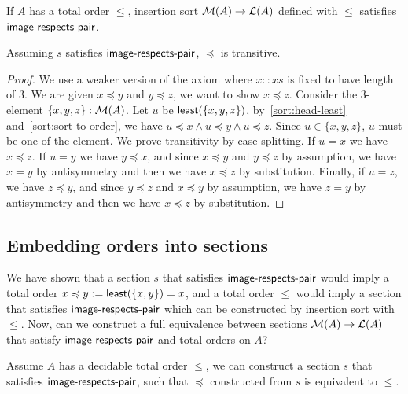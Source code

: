 \begin{proposition}
    If $A$ has a total order $\leq$, insertion sort $\mathcal{M}(A) \to \mathcal{L}(A)$ defined with $\leq$
    satisfies $\operatorname{\mathsf{image-respects-pair}}$.
\end{proposition}

\begin{proposition}
    Assuming $s$ satisfies $\operatorname{\mathsf{image-respects-pair}}$, $\preccurlyeq$ is transitive.
\end{proposition}
\begin{proof}
    We use a weaker version of the axiom where $x :: xs$ is fixed to have length of 3.
    We are given $x \preccurlyeq y$ and $y \preccurlyeq z$, we want to show $x \preccurlyeq z$.
    Consider the 3-element $\{x,y,z\} : \mathcal{M}(A)$. Let $u$ be $\operatorname{\mathsf{least}}(\{x,y,z\})$,
    by~\cref{sort:head-least} and~\cref{sort:sort-to-order},
    we have $u \preccurlyeq x \land u \preccurlyeq y \land u \preccurlyeq z$.
    Since $u \in \{x,y,z\}$, $u$ must be one of the element. We prove transitivity by case splitting.
    If $u = x$ we have $x \preccurlyeq z$. If $u = y$ we have $y \preccurlyeq x$, and since
    $x \preccurlyeq y$ and $y \preccurlyeq z$ by assumption,
    we have $x = y$ by antisymmetry and then we have $x \preccurlyeq z$ by substitution.
    Finally, if $u = z$, we have $z \preccurlyeq y$, and since
    $y \preccurlyeq z$ and $x \preccurlyeq y$ by assumption,
    we have $z = y$ by antisymmetry and then we have $x \preccurlyeq z$ by substitution.
\end{proof}

\subsection{Embedding orders into sections}

We have shown that a section $s$ that satisfies $\operatorname{\mathsf{image-respects-pair}}$ would imply a total order
$x \preccurlyeq y := \operatorname{\mathsf{least}}(\{x, y\}) = x$,
and a total order $\leq$ would imply a section that satisfies $\operatorname{\mathsf{image-respects-pair}}$ which can
be constructed by insertion sort with $\leq$. Now, can we construct a full equivalence
between sections $\mathcal{M}(A) \to \mathcal{L}(A)$ that satisfy $\operatorname{\mathsf{image-respects-pair}}$ and total orders on $A$?

\begin{proposition}\label{sort:o2s2o}
    Assume $A$ has a decidable total order $\leq$, we can construct a section $s$ that
    satisfies $\operatorname{\mathsf{image-respects-pair}}$, such that $\preccurlyeq$ constructed from $s$ is equivalent
    to $\leq$.
\end{proposition}

